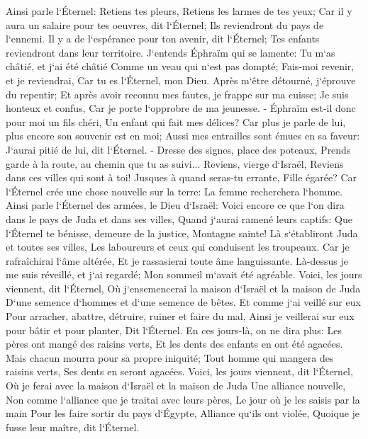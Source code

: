 \verse Ainsi parle l`Éternel: Retiens tes pleurs, Retiens les larmes de tes yeux; Car il y aura un salaire pour tes oeuvres, dit l`Éternel; Ils reviendront du pays de l`ennemi. 
\verse Il y a de l`espérance pour ton avenir, dit l`Éternel; Tes enfants reviendront dans leur territoire. 
\verse J`entends Éphraïm qui se lamente: Tu m`as châtié, et j`ai été châtié Comme un veau qui n`est pas dompté; Fais-moi revenir, et je reviendrai, Car tu es l`Éternel, mon Dieu. 
\verse Après m`être détourné, j`éprouve du repentir; Et après avoir reconnu mes fautes, je frappe sur ma cuisse; Je suis honteux et confus, Car je porte l`opprobre de ma jeunesse. - 
\verse Éphraïm est-il donc pour moi un fils chéri, Un enfant qui fait mes délices? Car plus je parle de lui, plus encore son souvenir est en moi; Aussi mes entrailles sont émues en sa faveur: J`aurai pitié de lui, dit l`Éternel. - 
\verse Dresse des signes, place des poteaux, Prends garde à la route, au chemin que tu as suivi... Reviens, vierge d`Israël, Reviens dans ces villes qui sont à toi! 
\verse Jusques à quand seras-tu errante, Fille égarée? Car l`Éternel crée une chose nouvelle sur la terre: La femme recherchera l`homme. 
\verse Ainsi parle l`Éternel des armées, le Dieu d`Israël: Voici encore ce que l`on dira dans le pays de Juda et dans ses villes, Quand j`aurai ramené leurs captifs: Que l`Éternel te bénisse, demeure de la justice, Montagne sainte! 
\verse Là s`établiront Juda et toutes ses villes, Les laboureurs et ceux qui conduisent les troupeaux. 
\verse Car je rafraîchirai l`âme altérée, Et je rassasierai toute âme languissante. 
\verse Là-dessus je me suis réveillé, et j`ai regardé; Mon sommeil m`avait été agréable. 
\verse Voici, les jours viennent, dit l`Éternel, Où j`ensemencerai la maison d`Israël et la maison de Juda D`une semence d`hommes et d`une semence de bêtes. 
\verse Et comme j`ai veillé sur eux Pour arracher, abattre, détruire, ruiner et faire du mal, Ainsi je veillerai sur eux pour bâtir et pour planter, Dit l`Éternel. 
\verse En ces jours-là, on ne dira plus: Les pères ont mangé des raisins verts, Et les dents des enfants en ont été agacées. 
\verse Mais chacun mourra pour sa propre iniquité; Tout homme qui mangera des raisins verts, Ses dents en seront agacées. 
\verse Voici, les jours viennent, dit l`Éternel, Où je ferai avec la maison d`Israël et la maison de Juda Une alliance nouvelle, 
\verse Non comme l`alliance que je traitai avec leurs pères, Le jour où je les saisis par la main Pour les faire sortir du pays d`Égypte, Alliance qu`ils ont violée, Quoique je fusse leur maître, dit l`Éternel. 

